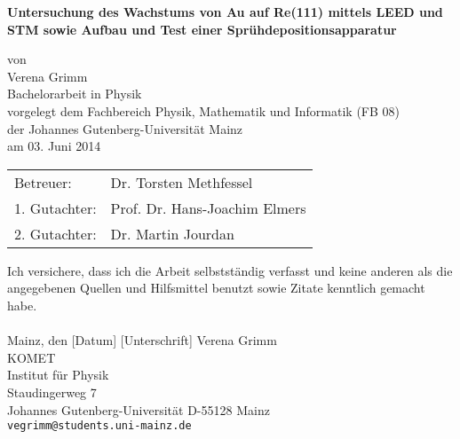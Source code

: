 \documentclass[pdftex,a4paper,german,openbib,final,11pt,twoside,chapterprefix,
headsepline]{scrbook}
\begin{document}

\begin{titlepage}
  \vspace*{6mm}
  \begin{center}
  \linespread{1.3}
     {\sffamily \bfseries \Huge  %
     Untersuchung des Wachstums von Au auf Re(111) mittels LEED und STM
     sowie Aufbau und Test einer Sprühdepositionsapparatur\par}
     \vspace*{3.5cm}
     {\large von}
     \\[3.5cm]
     \linespread{1}
     {\dfont Verena Grimm}
     \\[2cm]
     {\large Bachelorarbeit in Physik \/\\
        vorgelegt dem Fachbereich Physik, Mathematik und Informatik (FB 08) \/\\
        der Johannes Gutenberg-Universit\"at Mainz \/\\
        am 03. Juni 2014}
   \end{center}
   \newpage
	\null
	\vfill
	\begin{tabular}{ll}
	Betreuer: & Dr. Torsten Methfessel \\
	1. Gutachter: & Prof. Dr. Hans-Joachim Elmers\\
   	2. Gutachter: & Dr. Martin Jourdan
	\end{tabular}
   
\end{titlepage}



\thispagestyle{empty}
Ich versichere, dass ich die Arbeit selbstst\"andig verfasst und keine
anderen als die angegebenen Quellen und Hilfsmittel benutzt sowie
Zitate kenntlich gemacht habe.
\\
\\[3.5cm]
Mainz, den [Datum] [Unterschrift]
\vfill
\noindent
Verena Grimm\\
KOMET\\
Institut f\"ur Physik\\
Staudingerweg 7\\
Johannes Gutenberg-Universit\"at
D-55128 Mainz\\
{\tt vegrimm@students.uni-mainz.de}

\renewcommand\contentsname{Inhaltsverzeichnis}
\renewcommand\figurename{Abbildung}
\renewcommand\tablename{Tabelle}
\tableofcontents
\clearpage 
\end{document}
